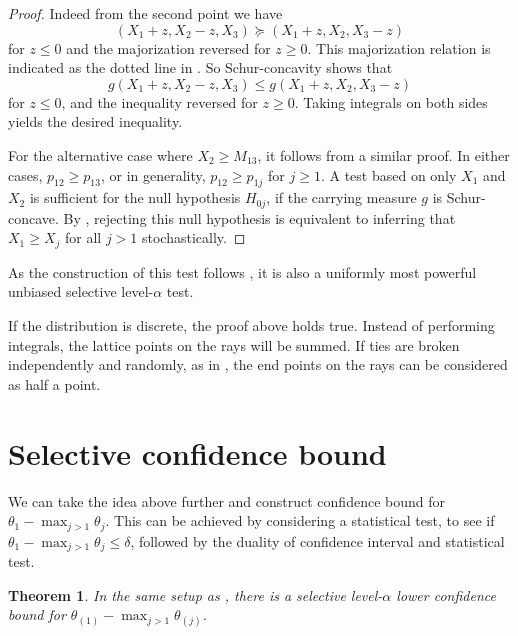 \documentclass[11pt]{article}
\newtheorem{theorem}{Theorem}
\begin{document}
\begin{proof}
Indeed from the second point  we have
$$\left(X_1 + z, X_2 - z, X_3\right) \succeq \left(X_1 + z, X_2, X_3 - z\right)$$
for $z \le 0$ and the majorization reversed for $z \ge 0$. This majorization relation is indicated as the dotted line in . So Schur-concavity shows that
$$g\left(X_1 + z, X_2 - z, X_3\right) \le g\left(X_1 + z, X_2, X_3 - z\right)$$
for $z \le 0$, and the inequality reversed for $z \ge 0$. Taking integrals on both sides yields the desired inequality.

For the alternative case where $X_2 \ge M_{13}$, it follows from a similar proof. In either cases, $p_{12} \ge p_{13}$, or in generality, $p_{12} \ge p_{1j}$ for $j \ge 1$. A test based on only $X_1$ and $X_2$ is sufficient for the null hypothesis $H_{0j}$, if the carrying measure $g$ is Schur-concave. By , rejecting this null hypothesis is equivalent to inferring that $X_1 \ge X_j$ for all $j>1$ stochastically.

\end{proof}

As the construction of this test follows \cite{Fithian:2014ws}, it is also a uniformly most powerful unbiased selective level-$\alpha$ test.

If the distribution is discrete, the proof above holds true. Instead of performing integrals, the lattice points on the rays will be summed. If ties are broken independently and randomly, as in , the end points on the rays can be considered as half a point.

\section{Selective confidence bound}
\label{sec:selective_confidence_bound}

We can take the idea above further and construct confidence bound for $\theta_1 - \max_{j>1} \theta_j$. This can be achieved by considering a statistical test, to see if $\theta_1 - \max_{j>1} \theta_j \le \delta$, followed by the duality of confidence interval and statistical test.

\begin{theorem}
In the same setup as , there is a selective level-$\alpha$ lower confidence bound for $\theta_{\left(1\right)} - \max_{j>1} \theta_{\left(j\right)}$.
\end{theorem}
\end{document}
